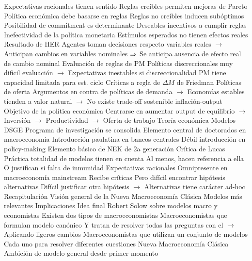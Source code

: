 \documentclass{nuevotema}
\begin{document}
\begin{esquemal}
				\4[] Expectativas racionales tienen sentido
				\4[] Reglas creíbles permiten mejoras de Pareto
				\4[$\then$] Política económica debe basarse en reglas
				\4[$\then$] Reglas no creíbles inducen subóptimos
				\4[$\then$] Posibilidad de commitment es determinante
				\4[$\then$] Deseables incentivos a cumplir reglas
			\3 Inefectividad de la política monetaria
				\4 Estímulos esperados no tienen efectos reales
				\4[] Resultado de HER
				\4[] Agentes toman decisiones respecto variables reales
				\4[] $\to$ Anticipan cambios en variables nominales
				\4[] $\then$ Se anticipa ausencia de efecto real de cambio nominal
				\4 Evaluación de reglas de PM
				\4[] Políticas discreccionales muy dificil evaluación
				\4[] $\to$ Expectativas inestables si discreccionalidad
				\4[$\then$] PM tiene capacidad limitada para est. ciclo
				\4[$\then$] Críticas a regla de $\Delta M$ de Friedman
			\3 Políticas de oferta
				\4 Argumentos en contra de políticas de demanda
				\4[] $\to$ Economías estables tienden a valor natural
				\4[] $\to$ No existe trade-off sostenible inflación-output
				\4 Objetivo de la política económica
				\4[] Centrarse en aumentar output de equilibrio
				\4[] $\to$ Inversión
				\4[] $\to$ Productividad
				\4[] $\to$ Oferta de trabajo
		\2 Teoría económica
			\3 Modelos DSGE
				\4 Programa de investigación se consolida
				\4 Elemento central de doctorados en macroeconomía
				\4 Introducción paulatina en bancos centrales
				\4 Débil introducción en policy-making
				\4 Elemento básico de NEK de 2a generación
			\3 Crítica de Lucas
				\4 Práctica totalidad de modelos tienen en cuenta
				\4[] Al menos, hacen referencia a ella
				\4[] O justifican si falta de inmunidad
			\3 Expectativas racionales
				\4 Omnipresente en macroeconomía mainstream
				\4 Recibe críticas
				\4[] Pero difícil encontrar hipótesis alternativas
				\4[] Difícil justificar otra hipótesis
				\4[] $\to$ Alternativas tiene carácter ad-hoc
	\1[] 
		\2 Recapitulación
			\3 Visión general de la Nueva Macroeconomía Clásica
			\3 Modelos más relevantes
			\3 Implicaciones
		\2 Idea final
			\3 Robert Solow sobre modelos macro y economistas
				\4 Existen dos tipos de macroeconomistas
				\4 Macroeconomistas que formulan modelo canónico
				\4[] Y tratan de resolver todas las preguntas con el
				\4[] $\to$ Aplicando ligeros cambios
				\4 Macroeconomistas que utilizan un conjunto de modelos
				\4[] Cada uno para resolver diferentes cuestiones
				\4 Nueva Macroeconomía Clásica
				\4[] Ambición de modelo general desde primer momento

\end{esquemal}
\end{document}
